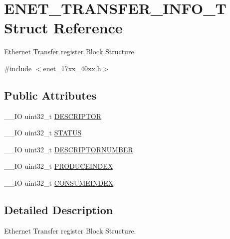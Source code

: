 \hypertarget{struct_e_n_e_t___t_r_a_n_s_f_e_r___i_n_f_o___t}{\section{E\+N\+E\+T\+\_\+\+T\+R\+A\+N\+S\+F\+E\+R\+\_\+\+I\+N\+F\+O\+\_\+\+T Struct Reference}
\label{struct_e_n_e_t___t_r_a_n_s_f_e_r___i_n_f_o___t}
}


Ethernet Transfer register Block Structure.  




{\ttfamily \#include $<$enet\+\_\+17xx\+\_\+40xx.\+h$>$}

\subsection*{Public Attributes}
\begin{DoxyCompactItemize}
\item 
\+\_\+\+\_\+\+I\+O uint32\+\_\+t \hyperlink{struct_e_n_e_t___t_r_a_n_s_f_e_r___i_n_f_o___t_a9eabd8ba19da27477fd1a07efe01161e}{D\+E\+S\+C\+R\+I\+P\+T\+O\+R}
\item 
\+\_\+\+\_\+\+I\+O uint32\+\_\+t \hyperlink{struct_e_n_e_t___t_r_a_n_s_f_e_r___i_n_f_o___t_ae72bffa37688d592667997f276ff28e2}{S\+T\+A\+T\+U\+S}
\item 
\+\_\+\+\_\+\+I\+O uint32\+\_\+t \hyperlink{struct_e_n_e_t___t_r_a_n_s_f_e_r___i_n_f_o___t_a5ee3c6f15d43d48fe6de2e52faa66610}{D\+E\+S\+C\+R\+I\+P\+T\+O\+R\+N\+U\+M\+B\+E\+R}
\item 
\+\_\+\+\_\+\+I\+O uint32\+\_\+t \hyperlink{struct_e_n_e_t___t_r_a_n_s_f_e_r___i_n_f_o___t_ab8f942719d586cb8d735dbe57341bc10}{P\+R\+O\+D\+U\+C\+E\+I\+N\+D\+E\+X}
\item 
\+\_\+\+\_\+\+I\+O uint32\+\_\+t \hyperlink{struct_e_n_e_t___t_r_a_n_s_f_e_r___i_n_f_o___t_a1704aa8577f168e0bb3565f68766e27c}{C\+O\+N\+S\+U\+M\+E\+I\+N\+D\+E\+X}
\end{DoxyCompactItemize}


\subsection{Detailed Description}
Ethernet Transfer register Block Structure. 

